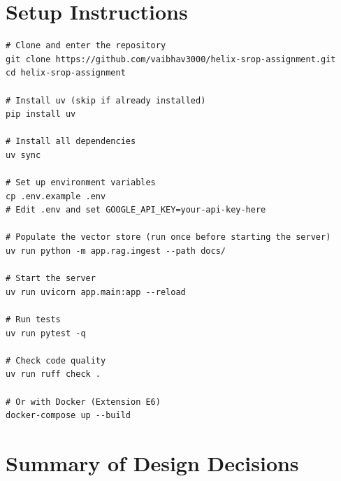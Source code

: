 \documentclass[12pt,a4paper]{article}
\begin{document}
\section{Setup Instructions}

\begin{lstlisting}[style=bash]
# Clone and enter the repository
git clone https://github.com/vaibhav3000/helix-srop-assignment.git
cd helix-srop-assignment

# Install uv (skip if already installed)
pip install uv

# Install all dependencies
uv sync

# Set up environment variables
cp .env.example .env
# Edit .env and set GOOGLE_API_KEY=your-api-key-here

# Populate the vector store (run once before starting the server)
uv run python -m app.rag.ingest --path docs/

# Start the server
uv run uvicorn app.main:app --reload

# Run tests
uv run pytest -q

# Check code quality
uv run ruff check .

# Or with Docker (Extension E6)
docker-compose up --build
\end{lstlisting}

\section{Summary of Design Decisions}
\end{document}
